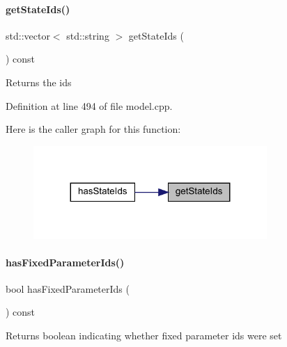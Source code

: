 \paragraph{\texorpdfstring{getStateIds()}{getStateIds()}}
{\footnotesize\ttfamily std\+::vector$<$ std\+::string $>$ get\+State\+Ids (\begin{DoxyParamCaption}{ }\end{DoxyParamCaption}) const\hspace{0.3cm}{\ttfamily [virtual]}}

\begin{DoxyReturn}{Returns}
the ids 
\end{DoxyReturn}


Definition at line 494 of file model.\+cpp.

Here is the caller graph for this function\+:
\nopagebreak
\begin{figure}[H]
\begin{center}
\leavevmode
\includegraphics[width=251pt]{classamici_1_1_model_a15fad6b42dcd725bdfc74fbab31b85e2_icgraph}
\end{center}
\end{figure}
\mbox{\label{classamici_1_1_model_af50d86316e6930bc98e82afc3893e2ff}} 
\paragraph{\texorpdfstring{hasFixedParameterIds()}{hasFixedParameterIds()}}
{\footnotesize\ttfamily bool has\+Fixed\+Parameter\+Ids (\begin{DoxyParamCaption}{ }\end{DoxyParamCaption}) const\hspace{0.3cm}{\ttfamily [virtual]}}

\begin{DoxyReturn}{Returns}
boolean indicating whether fixed parameter ids were set 
\end{DoxyReturn}


